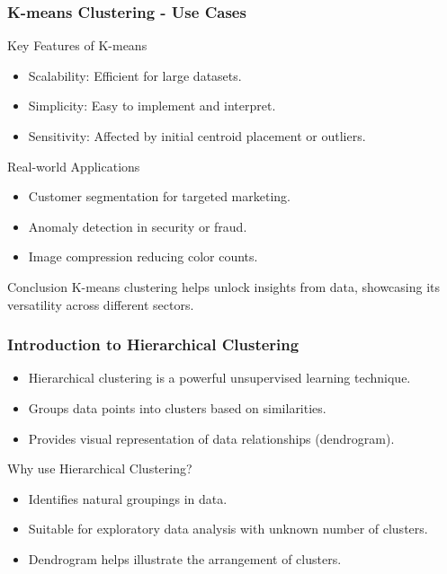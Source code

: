 \documentclass[aspectratio=169]{beamer}
\begin{document}
\begin{frame}[fragile]
    \frametitle{K-means Clustering - Use Cases}
    \begin{block}{Key Features of K-means}
        \begin{itemize}
            \item Scalability: Efficient for large datasets.
            \item Simplicity: Easy to implement and interpret.
            \item Sensitivity: Affected by initial centroid placement or outliers.
        \end{itemize}
    \end{block}

    \begin{block}{Real-world Applications}
        \begin{itemize}
            \item Customer segmentation for targeted marketing.
            \item Anomaly detection in security or fraud.
            \item Image compression reducing color counts.
        \end{itemize}
    \end{block}
    
    \begin{block}{Conclusion}
        K-means clustering helps unlock insights from data, showcasing its versatility across different sectors.
    \end{block}
\end{frame}

\begin{frame}[fragile]
    \titlepage
\end{frame}

\begin{frame}[fragile]
    \frametitle{Introduction to Hierarchical Clustering}
    \begin{itemize}
        \item Hierarchical clustering is a powerful unsupervised learning technique.
        \item Groups data points into clusters based on similarities.
        \item Provides visual representation of data relationships (dendrogram).
    \end{itemize}
    \begin{block}{Why use Hierarchical Clustering?}
        \begin{itemize}
            \item Identifies natural groupings in data.
            \item Suitable for exploratory data analysis with unknown number of clusters.
            \item Dendrogram helps illustrate the arrangement of clusters.
        \end{itemize}
    \end{block}
\end{frame}
\end{document}
